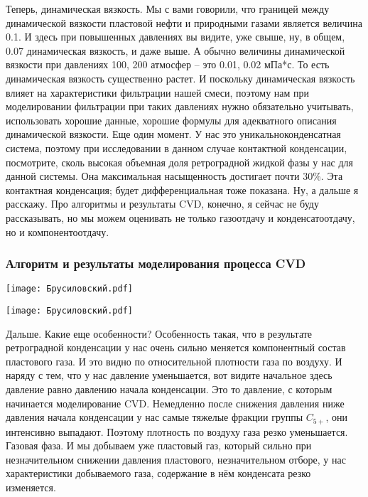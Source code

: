 \documentclass[main.tex]{subfiles}
\begin{document}
Теперь, динамическая вязкость.
Мы с вами говорили, что границей между динамической вязкости пластовой нефти и природными газами является величина 0.1.
И здесь при повышенных давлениях вы видите, уже свыше, ну, в общем, 0.07 динамическая вязкость, и даже выше.
А обычно величины динамической вязкости при давлениях 100, 200 атмосфер -- это 0.01, 0.02 мПа*с.
То есть динамическая вязкость существенно растет.
И поскольку динамическая вязкость влияет на характеристики фильтрации нашей смеси, поэтому нам при моделировании фильтрации при таких давлениях нужно обязательно учитывать, использовать хорошие данные, хорошие формулы для адекватного описания динамической вязкости.
Еще один момент.
У нас это уникальноконденсатная система, поэтому при исследовании в данном случае контактной конденсации, посмотрите, сколь высокая объемная доля ретроградной жидкой фазы у нас для данной системы.
Она максимальная насыщенность достигает почти 30\%.
Эта контактная конденсация; будет дифференциальная тоже показана.
Ну, а дальше я расскажу.
Про алгоритмы и результаты CVD, конечно, я сейчас не буду рассказывать, но мы можем оценивать не только газоотдачу и конденсатоотдачу, но и компонентоотдачу.

\subsubsection{Алгоритм и результаты моделирования процесса CVD}

\begin{center}
\texttt{[image: Брусиловский.pdf]}
\end{center}

\begin{center}
\texttt{[image: Брусиловский.pdf]}
\end{center}

Дальше.
Какие еще особенности?
Особенность такая, что в результате ретроградной конденсации у нас очень сильно меняется компонентный состав пластового газа.
И это видно по относительной плотности газа по воздуху.
И наряду с тем, что у нас давление уменьшается, вот видите начальное здесь давление равно давлению начала конденсации.
Это то давление, с которым начинается моделирование CVD.
Немедленно после снижения давления ниже давления начала конденсации у нас самые тяжелые фракции группы $C_{5+}$, они интенсивно выпадают.
Поэтому плотность по воздуху газа резко уменьшается.
Газовая фаза.
И мы добываем уже пластовый газ, который сильно при незначительном снижении давления пластового, незначительном отборе, у нас характеристики добываемого газа, содержание в нём конденсата резко изменяется.
\end{document}
